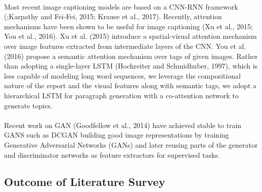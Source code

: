 \documentclass[12pt]{article}
\numberwithin{figure}{section}
\begin{document}
\paragraph{}
Most recent image captioning models are based on a CNN-RNN framework (\cite{4};Karpathy and Fei-Fei, 2015\cite{5}; Krause et al., 2017\cite{6}). Recently, attention mechanisms have been shown to be useful for image captioning (Xu et al., 2015\cite{7}; You et al., 2016\cite{8}). Xu et al. (2015)\cite{7} introduce a spatial-visual attention mechanism over image features extracted from intermediate layers of the CNN. You et al. (2016)\cite{8} propose a semantic attention mechanism over tags of given images. Rather than adopting a single-layer LSTM (Hochreiter and Schmidhuber, 1997)\cite{11}, which is less capable of modeling long word sequences, we leverage the compositional nature of the report and the visual features along with semantic tags, we adopt  a hierarchical LSTM for paragraph generation with a co-attention network to generate topics. 
\paragraph{}
Recent work on GAN (Goodfellow
et al., 2014)\cite{9} have achieved stable to train GANS such as DCGAN \cite{10} building good image representations by training Generative Adversarial Networks (GANs) and later reusing parts of the generator and discriminator networks as feature extractors for supervised tasks. 
\paragraph{}


\clearpage
\subsection{Outcome of Literature Survey}
\end{document}
